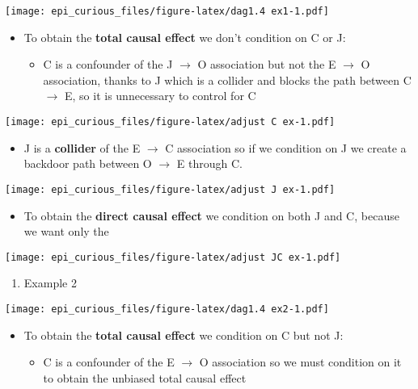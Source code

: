 \documentclass[
]{article}
\providecommand{\tightlist}{%
  \setlength{\itemsep}{0pt}\setlength{\parskip}{0pt}}
\begin{document}
\texttt{[image: epi\_curious\_files/figure-latex/dag1.4 ex1-1.pdf]}

\begin{itemize}
\item
  To obtain the \textbf{total causal effect} we don't condition on C or
  J:

  \begin{itemize}
  \tightlist
  \item
    C is a confounder of the J \(\to\) O association but not the E
    \(\to\) O association, thanks to J which is a collider and blocks
    the path between C \(\to\) E, so it is unnecessary to control for C
  \end{itemize}
\end{itemize}

\texttt{[image: epi\_curious\_files/figure-latex/adjust C ex-1.pdf]}

\begin{itemize}
\tightlist
\item
  J is a \textbf{collider} of the E \(\to\) C association so if we
  condition on J we create a backdoor path between O \(\to\) E through
  C.
\end{itemize}

\texttt{[image: epi\_curious\_files/figure-latex/adjust J ex-1.pdf]}

\begin{itemize}
\tightlist
\item
  To obtain the \textbf{direct causal effect} we condition on both J and
  C, because we want only the
\end{itemize}

\texttt{[image: epi\_curious\_files/figure-latex/adjust JC ex-1.pdf]}

\begin{enumerate}
\def\labelenumi{\arabic{enumi}.}
\setcounter{enumi}{1}
\tightlist
\item
  Example 2
\end{enumerate}

\texttt{[image: epi\_curious\_files/figure-latex/dag1.4 ex2-1.pdf]}

\begin{itemize}
\item
  To obtain the \textbf{total causal effect} we condition on C but not
  J:

  \begin{itemize}
  \tightlist
  \item
    C is a confounder of the E \(\to\) O association so we must
    condition on it to obtain the unbiased total causal effect
  \end{itemize}
\end{itemize}
\end{document}
